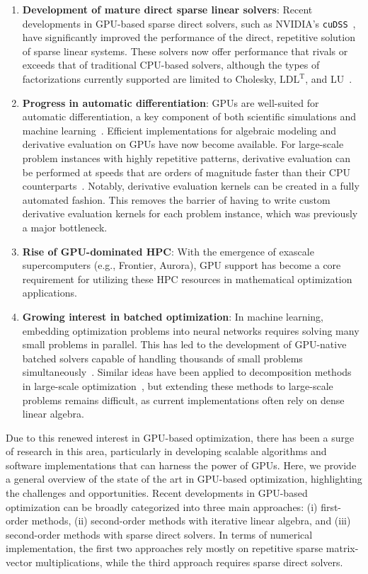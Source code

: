 \documentclass[smallextended]{svjour3}
\newcommand{\ldlt}{$\mathrm{LDL^T}$\xspace}
\begin{document}
\begin{enumerate}
\item \textbf{Development of mature direct sparse linear solvers}: Recent developments in GPU-based sparse direct solvers, such as NVIDIA's {\tt cuDSS}~\cite{nvidiaNVIDIACuDSSPreview}, have significantly improved the performance of the direct, repetitive solution of sparse linear systems. These solvers now offer performance that rivals or exceeds that of traditional CPU-based solvers, although the types of factorizations currently supported are limited to Cholesky, \ldlt, and LU~\cite{nvidiaNVIDIACuDSSPreview,shin2023accelerating}.
\item \textbf{Progress in automatic differentiation}: GPUs are well-suited for automatic differentiation, a key component of both scientific simulations and machine learning~\cite{jax2018github,enzyme2021}. Efficient implementations for algebraic modeling and derivative evaluation on GPUs have now become available. For large-scale problem instances with highly repetitive patterns, derivative evaluation can be performed at speeds that are orders of magnitude faster than their CPU counterparts~\cite{shin2023accelerating}. Notably, derivative evaluation kernels can be created in a fully automated fashion. This removes the barrier of having to write custom derivative evaluation kernels for each problem instance, which was previously a major bottleneck.
\item \textbf{Rise of GPU-dominated HPC}: With the emergence of exascale supercomputers (e.g., Frontier, Aurora), GPU support has become a core requirement for utilizing these HPC resources in mathematical optimization applications.
\item \textbf{Growing interest in batched optimization}:
  In machine learning, embedding optimization problems into neural networks requires solving many small problems in parallel. This has led to the development of GPU-native batched solvers capable of handling thousands of small problems simultaneously~\cite{amos2017optnet,pineda2022theseus}. Similar ideas have been applied to decomposition methods in large-scale optimization~\cite{kimLeveragingGPUBatching2021}, but extending these methods to large-scale problems remains difficult, as current implementations often rely on dense linear algebra.
\end{enumerate}


Due to this renewed interest in GPU-based optimization, there has been a surge of research in this area, particularly in developing scalable algorithms and software implementations that can harness the power of GPUs. Here, we provide a general overview of the state of the art in GPU-based optimization, highlighting the challenges and opportunities. Recent developments in GPU-based optimization can be broadly categorized into three main approaches: (i) first-order methods, (ii) second-order methods with iterative linear algebra, and (iii) second-order methods with sparse direct solvers. In terms of numerical implementation, the first two approaches rely mostly on repetitive sparse matrix-vector multiplications, while the third approach requires sparse direct solvers.
\end{document}
